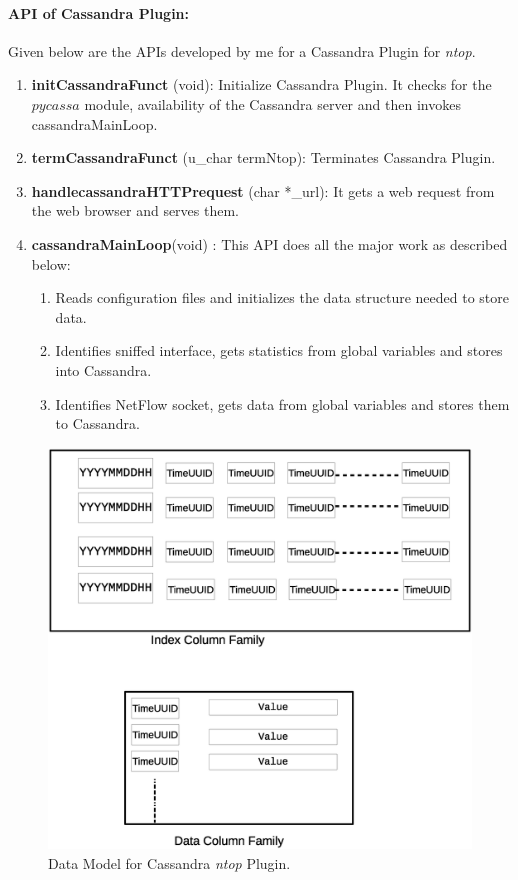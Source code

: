       \paragraph{API of Cassandra Plugin:} Given below are the APIs developed by me for a
      Cassandra Plugin for \emph{ntop}.\\
      
      \begin{enumerate}
       \item {\bf initCassandraFunct } (void): Initialize Cassandra Plugin. It checks for the $pycassa$ module, 
	      availability of the Cassandra server and then invokes cassandraMainLoop.
       \item {\bf termCassandraFunct} (u\_char termNtop): Terminates Cassandra Plugin.
       \item {\bf handlecassandraHTTPrequest} (char *\_url): It gets a web request from the web browser and serves them.\\
       \item {\bf cassandraMainLoop}(void) : This API does all the major work as described below:
	      \begin{enumerate}
	      \item Reads configuration files and initializes the data structure needed to store data.
	       \item Identifies sniffed interface, gets statistics from global variables and stores into Cassandra.
	       \item Identifies NetFlow socket, gets data from global variables and stores them to Cassandra. 
	      \end{enumerate}
      \end{enumerate}


      \begin{figure}[htb]
	    \centering
	    \includegraphics[scale = .4]{data_model}
	    \caption{Data Model for Cassandra \emph{ntop} Plugin.} 
	    \label{datamodel}
	  \end{figure}
	  

